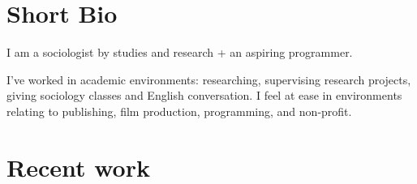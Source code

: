 \makeprofile %

\vfill 


\section{Short Bio} %

I am a sociologist by studies and research + %
an aspiring programmer. %

% 

I've worked in academic environments: researching, supervising research projects, giving sociology classes and English conversation.
I feel at ease in environments relating to publishing, film production, programming, and non-profit. %


\section{Recent work}

